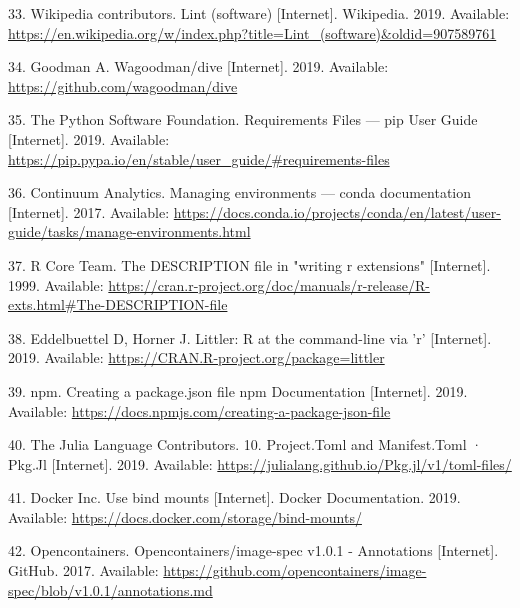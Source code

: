 \documentclass[10pt,letterpaper]{article}
\begin{document}
\leavevmode\hypertarget{ref-wikipedia_contributors_lint_2019}{}%
33. Wikipedia contributors. Lint (software) {[}Internet{]}. Wikipedia.
2019. Available:
\url{https://en.wikipedia.org/w/index.php?title=Lint_(software)\&oldid=907589761}

\leavevmode\hypertarget{ref-goodman_dive_2019}{}%
34. Goodman A. Wagoodman/dive {[}Internet{]}. 2019. Available:
\url{https://github.com/wagoodman/dive}

\leavevmode\hypertarget{ref-the_python_software_foundation_requirements_2019}{}%
35. The Python Software Foundation. Requirements Files --- pip User
Guide {[}Internet{]}. 2019. Available:
\url{https://pip.pypa.io/en/stable/user_guide/\#requirements-files}

\leavevmode\hypertarget{ref-continuum_analytics_managing_2017}{}%
36. Continuum Analytics. Managing environments --- conda documentation
{[}Internet{]}. 2017. Available:
\url{https://docs.conda.io/projects/conda/en/latest/user-guide/tasks/manage-environments.html}

\leavevmode\hypertarget{ref-r_core_team_description_1999}{}%
37. R Core Team. The DESCRIPTION file in "writing r extensions"
{[}Internet{]}. 1999. Available:
\url{https://cran.r-project.org/doc/manuals/r-release/R-exts.html\#The-DESCRIPTION-file}

\leavevmode\hypertarget{ref-eddelbuettel_littler_2019}{}%
38. Eddelbuettel D, Horner J. Littler: R at the command-line via 'r'
{[}Internet{]}. 2019. Available:
\url{https://CRAN.R-project.org/package=littler}

\leavevmode\hypertarget{ref-npm_creating_2019}{}%
39. npm. Creating a package.json file npm Documentation {[}Internet{]}.
2019. Available:
\url{https://docs.npmjs.com/creating-a-package-json-file}

\leavevmode\hypertarget{ref-julia_tomls_2019}{}%
40. The Julia Language Contributors. 10. Project.Toml and Manifest.Toml
· Pkg.Jl {[}Internet{]}. 2019. Available:
\url{https://julialang.github.io/Pkg.jl/v1/toml-files/}

\leavevmode\hypertarget{ref-docker_use_2019}{}%
41. Docker Inc. Use bind mounts {[}Internet{]}. Docker Documentation.
2019. Available: \url{https://docs.docker.com/storage/bind-mounts/}

\leavevmode\hypertarget{ref-opencontainers_image-spec_2017}{}%
42. Opencontainers. Opencontainers/image-spec v1.0.1 - Annotations
{[}Internet{]}. GitHub. 2017. Available:
\url{https://github.com/opencontainers/image-spec/blob/v1.0.1/annotations.md}
\end{document}
